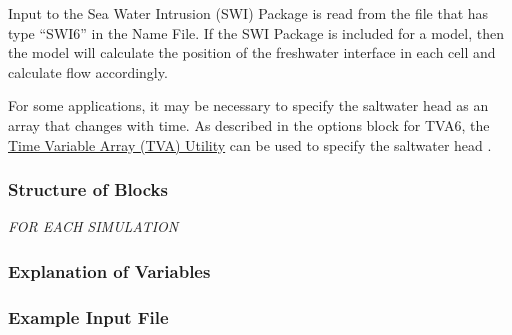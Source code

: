 Input to the Sea Water Intrusion (SWI) Package is read from the file that has type ``SWI6'' in the Name File.  If the SWI Package is included for a model, then the model will calculate the position of the freshwater interface in each cell and calculate flow accordingly.

For some applications, it may be necessary to specify the saltwater head as an array that changes with time.  As described in the options block for TVA6, the  \hyperref[sec:tva]{Time Variable Array (TVA) Utility} can be used to specify the saltwater head .

\vspace{5mm}
\subsubsection{Structure of Blocks}

\vspace{5mm}
\noindent \textit{FOR EACH SIMULATION}


%

\vspace{5mm}
\subsubsection{Explanation of Variables}
\begin{description}

\end{description}

\vspace{5mm}
\subsubsection{Example Input File}


